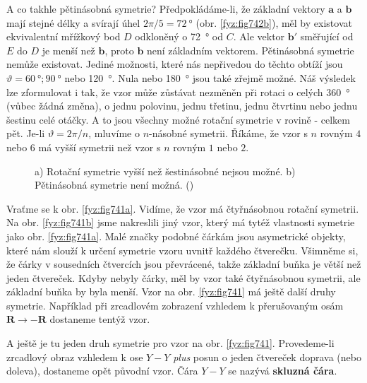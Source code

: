     A co takhle pětinásobná symetrie? Předpokládáme-li, že základní vektory \(\bm{a}\) a \(\bm{b}\) 
    mají stejné délky a svírají úhel \(2\pi /5 = \SI{72}{\degree}\) (obr. \ref{fyz:fig742b}), měl 
    by existovat ekvivalentní mřížkový bod \(D\) odkloněný o \SI{72}{\degree} od \(C\). Ale vektor 
    \(\bm{b'}\) směřující od \(E\) do \(D\) je menší než \(\bm{b}\), proto \(\bm{b}\) není 
    základním vektorem. Pětinásobná symetrie nemůže existovat. Jediné možnosti, které nás 
    nepřivedou do těchto obtíží jsou \(\vartheta = \SI{60}{\degree}; \SI{90}{\degree}\) nebo 
    \SI{120}{\degree}. Nula nebo \SI{180}{\degree} jsou také zřejmě možné. Náš výsledek lze 
    zformulovat i tak, že vzor může zůstávat nezměněn při rotaci o celých \SI{360}{\degree} (vůbec 
    žádná změna), o jednu polovinu, jednu třetinu, jednu čtvrtinu nebo jednu šestinu celé otáčky. A 
    to jsou všechny možné rotační symetrie v rovině - celkem pět. Je-li \(\vartheta = 2\pi/n\), 
    mluvíme o \(n\)-násobné symetrii. Říkáme, že vzor s \(n\) rovným \(4\) nebo \(6\) má vyšší 
    symetrii než vzor s \(n\) rovným \(1\) nebo \(2\). 

    \begin{figure}[ht!]    %
      \centering
                     \newline
      \caption{a) Rotační symetrie vyšší než šestinásobné nejsou možné. b) Pětinásobná symetrie 
               není možná.
               (\cite[s.~550]{Feynman02})}
      \label{fyz:fig742}
    \end{figure}

    Vraťme se k obr. \ref{fyz:fig741a}. Vidíme, že vzor má čtyřnásobnou rotační symetrii. Na obr. 
    \ref{fyz:fig741b} jsme nakreslili jiný vzor, který má tytéž vlastnosti symetrie jako obr. 
    \ref{fyz:fig741a}. Malé značky podobné čárkám jsou asymetrické objekty, které nám slouží k 
    určení symetrie vzoru uvnitř každého čtverečku. Všimněme si, že čárky v sousedních čtvercích 
    jsou převrácené, takže základní buňka je větší než jeden čtvereček. Kdyby nebyly čárky, měl by 
    vzor také čtyřnásobnou symetrii, ale základní buňka by byla menší. Vzor na obr. 
    \ref{fyz:fig741} má ještě další druhy symetrie. Například při zrcadlovém zobrazení vzhledem k 
    přerušovaným osám \(\bm{R} \rightarrow \bm{-R}\) dostaneme tentýž vzor. 

    A ještě je tu jeden druh symetrie pro vzor na obr. \ref{fyz:fig741}. Provedeme-li zrcadlový 
    obraz vzhledem k ose \(Y-Y\) \emph{plus} posun o jeden čtvereček doprava (nebo doleva), 
    dostaneme opět původní vzor. Čára \(Y-Y\) se nazývá \textbf{skluzná čára}.

